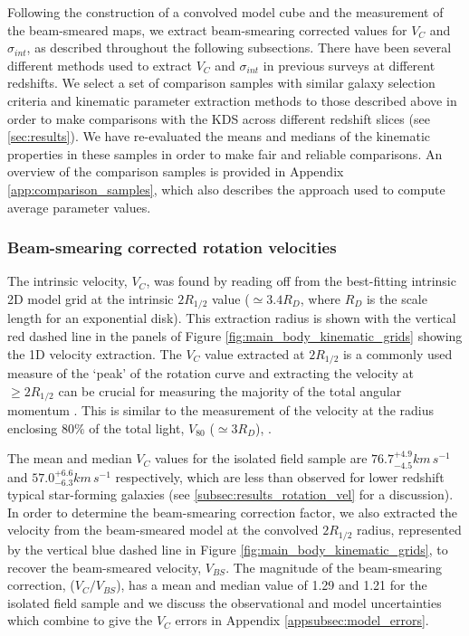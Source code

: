\documentclass[fleqn,usenatbib]{mnras}
\begin{document}
Following the construction of a convolved model cube and the measurement of the beam-smeared maps, we extract beam-smearing corrected values for $V_{C}$ and $\sigma_{int}$, as described throughout the following subsections.
There have been several different methods used to extract $V_{C}$ and $\sigma_{int}$ in previous surveys at different redshifts.
We select a set of comparison samples with similar galaxy selection criteria and kinematic parameter extraction methods to those described above in order to make comparisons with the KDS across different redshift slices (see \cref{sec:results}).
We have re-evaluated the means and medians of the kinematic properties in these samples in order to make fair and reliable comparisons.
An overview of the comparison samples is provided in Appendix \ref{app:comparison_samples}, which also describes the approach used to compute average parameter values.

\subsubsection{Beam-smearing corrected rotation velocities}\label{subsubsec:beam_smearing_corrected_velocities}
The intrinsic velocity, $V_{C}$, was found by reading off from the best-fitting intrinsic 2D model grid at the intrinsic $2R_{1/2}$ value ($\simeq3.4R_{D}$, where $R_{D}$ is the scale length for an exponential disk).
This extraction radius is shown with the vertical red dashed line in the panels of Figure \ref{fig:main_body_kinematic_grids} showing the 1D velocity extraction.
The $V_{C}$ value extracted at $2R_{1/2}$ is a commonly used measure of the `peak' of the rotation curve \citep[e.g.][]{Miller2011,Stott2016,Pelliccia2017,Harrison2017,Swinbank2017} and extracting the velocity at $\geqslant 2R_{1/2}$ can be crucial for measuring the majority of the total angular momentum \citep[e.g.][]{Obreschkow2016,Harrison2017,Swinbank2017}.
This is similar to the measurement of the velocity at the radius enclosing 80$\%$ of the total light, $V_{80}$ ($\simeq3R_{D}$), \citep{Tiley2016}.

The mean and median $V_{C}$ values for the isolated field sample are $76.7^{+4.9}_{-4.5}km\,s^{-1}$ and $57.0^{+6.6}_{-6.3}km\,s^{-1}$ respectively, which are less than observed for lower redshift typical star-forming galaxies (see \cref{subsec:results_rotation_vel} for a discussion).
In order to determine the beam-smearing correction factor, we also extracted the velocity from the beam-smeared model at the convolved $2R_{1/2}$ radius, represented by the vertical blue dashed line in Figure \ref{fig:main_body_kinematic_grids}, to recover the beam-smeared velocity, $V_{BS}$.
The magnitude of the beam-smearing correction, ($V_{C}/V_{BS}$), has a mean and median value of 1.29 and 1.21 for the isolated field sample and we discuss the observational and model uncertainties which combine to give the $V_{C}$ errors in Appendix \ref{appsubsec:model_errors}. \\
\end{document}
